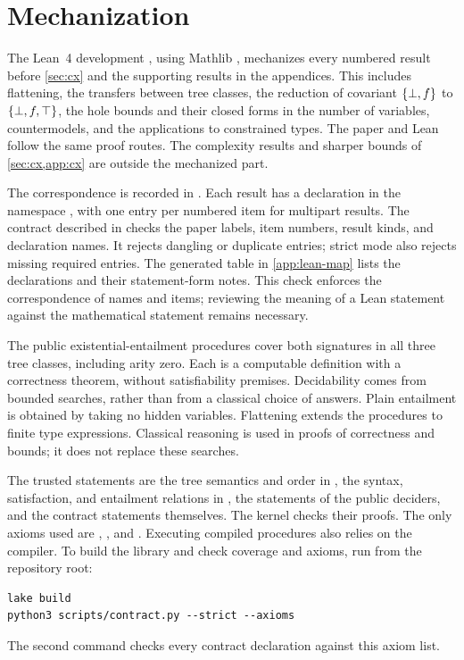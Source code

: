 \section{Mechanization}
\label{sec:mechanization}

The Lean~4 development \citep{MouraUllrich21}, using Mathlib
\citep{Mathlib20}, mechanizes every numbered result before \cref{sec:cx}
and the supporting results in the appendices. This includes flattening,
the transfers between tree classes, the reduction of covariant $\{\bot,f\}$ to
$\{\bot,f,\top\}$, the hole bounds and their closed forms in the number of variables,
countermodels, and the applications to constrained types. The paper and Lean
follow the same proof routes. The complexity results and sharper bounds of
\cref{sec:cx,app:cx} are outside the mechanized part.

The correspondence is recorded in . Each result
has a declaration in the namespace , with one entry per
numbered item for multipart results. The contract described in
 checks the paper labels, item numbers,
result kinds, and declaration names. It rejects dangling or duplicate entries;
strict mode also rejects missing required entries. The generated table in
\cref{app:lean-map} lists the declarations and their statement-form notes.
This check enforces the correspondence of names and items; reviewing the
meaning of a Lean statement against the mathematical statement remains
necessary.

The public existential-entailment procedures cover both signatures in all
three tree classes, including arity zero. Each is a computable definition
with a correctness theorem, without satisfiability premises. Decidability
comes from bounded searches, rather than from a classical choice of answers.
Plain entailment is obtained by taking no hidden variables. Flattening extends
the procedures to finite type expressions. Classical reasoning is used in
proofs of correctness and bounds; it does not replace these searches.

The trusted statements are the tree semantics and order in
, the syntax, satisfaction, and entailment relations
in , the statements of the public deciders, and
the contract statements themselves. The kernel checks their proofs. The only
axioms used are , , and .
Executing compiled procedures also relies on the compiler. To build the
library and check coverage and axioms, run from the repository root:
\begin{lstlisting}
lake build
python3 scripts/contract.py --strict --axioms
\end{lstlisting}
The second command checks every contract declaration against this axiom list.

